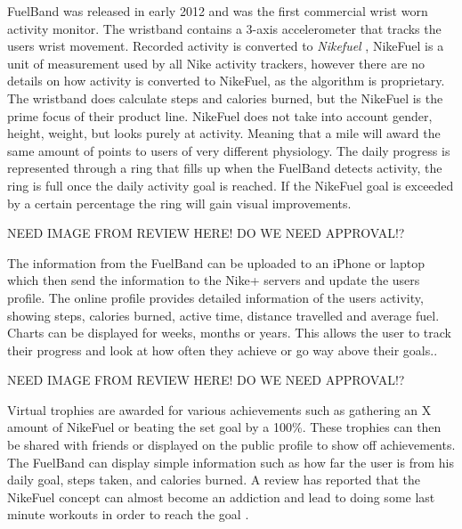 FuelBand was released in early 2012 and was the first commercial wrist worn activity monitor. The wristband contains a 3-axis accelerometer that tracks the users wrist movement. Recorded activity is converted to \emph{Nikefuel} \cite{nikefuel}, NikeFuel is a unit of measurement used by all Nike activity trackers, however there are no details on how activity is converted to NikeFuel, as the algorithm is proprietary. The wristband does calculate steps and calories burned, but the NikeFuel is the prime focus of their product line. NikeFuel does not take into account gender, height, weight, but looks purely at activity. Meaning that a mile will award the same amount of points to users of very different physiology. The daily progress is represented through a ring that fills up when the FuelBand detects activity, the ring is full once the daily activity goal is reached. If the NikeFuel goal is exceeded by a certain percentage the ring will gain visual improvements. 

NEED IMAGE FROM REVIEW HERE! DO WE NEED APPROVAL!?%

The information from the FuelBand can be uploaded to an iPhone or laptop which then send the information to the Nike+ servers and update the users profile. The online profile provides detailed information of the users activity, showing steps, calories burned, active time, distance travelled and average fuel. Charts can be displayed for weeks, months or years. This allows the user to track their progress and look at how often they achieve or go way above their goals.\cite{fuelbandTechSpce}. 
 
NEED IMAGE FROM REVIEW HERE! DO WE NEED APPROVAL!?%
 
Virtual trophies are awarded for various achievements such as gathering an X amount of NikeFuel or beating the set goal by a 100\%. These trophies can then be shared with friends or displayed on the public profile to show off achievements. The FuelBand can display simple information such as how far the user is from his daily goal, steps taken, and calories burned. A review has reported that the NikeFuel concept can almost become an addiction and lead to doing some last minute workouts in order to reach the goal \cite{fuelbandDcRain}.


